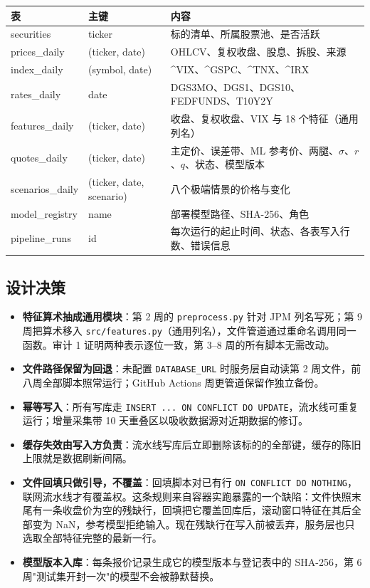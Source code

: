 \documentclass[11pt]{ctexart}
\begin{document}
\begin{center}\small
\begin{tabular}{p{3.0cm}p{4.0cm}p{7.8cm}}
\toprule
表 & 主键 & 内容 \\
\midrule
securities & ticker & 标的清单、所属股票池、是否活跃 \\
prices\_daily & (ticker, date) & OHLCV、复权收盘、股息、拆股、来源 \\
index\_daily & (symbol, date) & \^{}VIX、\^{}GSPC、\^{}TNX、\^{}IRX \\
rates\_daily & date & DGS3MO、DGS1、DGS10、FEDFUNDS、T10Y2Y \\
features\_daily & (ticker, date) & 收盘、复权收盘、VIX 与 18 个特征（通用列名） \\
quotes\_daily & (ticker, date) & 主定价、误差带、ML 参考价、两腿、$\sigma$、$r$、$q$、状态、模型版本 \\
scenarios\_daily & (ticker, date, scenario) & 八个极端情景的价格与变化 \\
model\_registry & name & 部署模型路径、SHA-256、角色 \\
pipeline\_runs & id & 每次运行的起止时间、状态、各表写入行数、错误信息 \\
\bottomrule
\end{tabular}
\end{center}

\subsection{设计决策}

\begin{itemize}
  \item \textbf{特征算术抽成通用模块}：第 2 周的 \texttt{preprocess.py} 针对 JPM 列名写死；第 9 周把算术移入 \texttt{src/features.py}（通用列名），文件管道通过重命名调用同一函数。审计 1 证明两种表示逐位一致，第 3--8 周的所有脚本无需改动。
  \item \textbf{文件路径保留为回退}：未配置 \texttt{DATABASE\_URL} 时服务层自动读第 2 周文件，前八周全部脚本照常运行；GitHub Actions 周更管道保留作独立备份。
  \item \textbf{幂等写入}：所有写库走 \texttt{INSERT ... ON CONFLICT DO UPDATE}，流水线可重复运行；增量采集带 10 天重叠区以吸收数据源对近期数据的修订。
  \item \textbf{缓存失效由写入方负责}：流水线写库后立即删除该标的的全部键，缓存的陈旧上限就是数据刷新间隔。
  \item \textbf{文件回填只做引导，不覆盖}：回填脚本对已有行 \texttt{ON CONFLICT DO NOTHING}，联网流水线才有覆盖权。这条规则来自容器实跑暴露的一个缺陷：文件快照末尾有一条收盘价为空的残缺行，回填把它覆盖回库后，滚动窗口特征在其后全部变为 NaN，参考模型拒绝输入。现在残缺行在写入前被丢弃，服务层也只选取全部特征完整的最新一行。
  \item \textbf{模型版本入库}：每条报价记录生成它的模型版本与登记表中的 SHA-256，第 6 周"测试集开封一次"的模型不会被静默替换。
\end{itemize}
\end{document}
